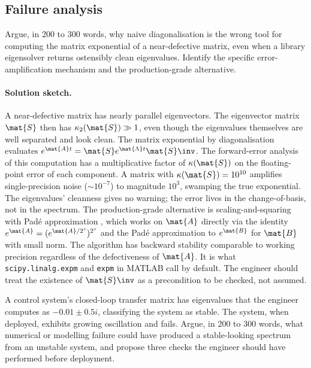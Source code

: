 \subsection*{Failure analysis}

\begin{exercise}
Argue, in 200 to 300 words, why naive diagonalisation is the wrong
tool for computing the matrix exponential of a near-defective
matrix, even when a library eigensolver returns ostensibly clean
eigenvalues. Identify the specific error-amplification mechanism
and the production-grade alternative.
\end{exercise}

\paragraph{Solution sketch.}
A near-defective matrix has nearly parallel eigenvectors. The
eigenvector matrix $\mat{S}$ then has $\kappa_{2}(\mat{S}) \gg 1$,
even though the eigenvalues themselves are well separated and
look clean. The matrix exponential by diagonalisation evaluates
$e^{\mat{A} t} = \mat{S} e^{\mat{\Lambda} t} \mat{S}\inv$. The
forward-error analysis of this computation has a multiplicative
factor of $\kappa(\mat{S})$ on the floating-point error of each
component. A matrix with $\kappa(\mat{S}) = 10^{10}$ amplifies
single-precision noise ($\sim 10^{-7}$) to magnitude $10^{3}$,
swamping the true exponential. The eigenvalues' cleanness gives no
warning; the error lives in the change-of-basis, not in the
spectrum. The production-grade alternative is scaling-and-squaring
with Pad\'e approximation \cite[ch.~10]{text:v2ch10-higham-functions2008},
which works on $\mat{A}$ directly via the identity $e^{\mat{A}} =
(e^{\mat{A}/2^{s}})^{2^{s}}$ and the Pad\'e approximation to
$e^{\mat{B}}$ for $\mat{B}$ with small norm. The algorithm has
backward stability comparable to working precision regardless of the
defectiveness of $\mat{A}$. It is what \texttt{scipy.linalg.expm}
and \texttt{expm} in MATLAB call by default. The engineer should
treat the existence of $\mat{S}\inv$ as a precondition to be
checked, not assumed.

\begin{exercise}
A control system's closed-loop transfer matrix has eigenvalues that
the engineer computes as $-0.01 \pm 0.5 i$, classifying the system
as stable. The system, when deployed, exhibits growing oscillation
and fails. Argue, in 200 to 300 words, what numerical or modelling
failure could have produced a stable-looking spectrum from an
unstable system, and propose three checks the engineer should have
performed before deployment.
\end{exercise}

